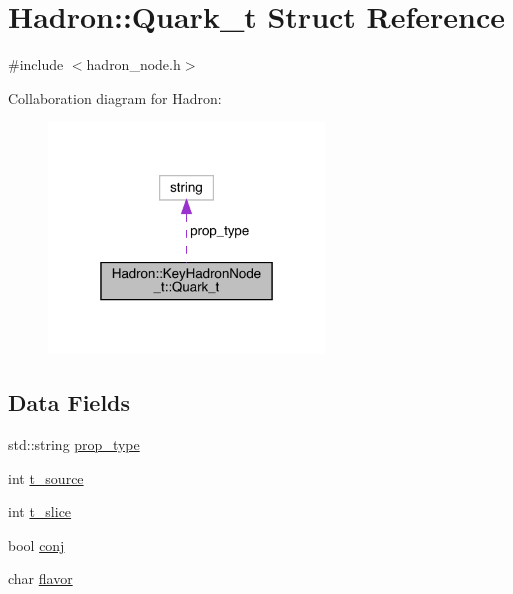 \hypertarget{structHadron_1_1KeyHadronNode__t_1_1Quark__t}{}\section{Hadron\+:\+:Quark\+\_\+t Struct Reference}
\label{structHadron_1_1KeyHadronNode__t_1_1Quark__t}


{\ttfamily \#include $<$hadron\+\_\+node.\+h$>$}



Collaboration diagram for Hadron\+:\nopagebreak
\begin{figure}[H]
\begin{center}
\leavevmode
\includegraphics[width=208pt]{d4/d23/structHadron_1_1KeyHadronNode__t_1_1Quark__t__coll__graph}
\end{center}
\end{figure}
\subsection*{Data Fields}
\begin{DoxyCompactItemize}
\item 
std\+::string \mbox{\hyperlink{structHadron_1_1KeyHadronNode__t_1_1Quark__t_a525075ad356f904d39a25478748d067f}{prop\+\_\+type}}
\item 
int \mbox{\hyperlink{structHadron_1_1KeyHadronNode__t_1_1Quark__t_af7bcd4ab54e441cfbc6dbf2ba43f3fa6}{t\+\_\+source}}
\item 
int \mbox{\hyperlink{structHadron_1_1KeyHadronNode__t_1_1Quark__t_add3ee9face146fee3b2a6dc0eff02b02}{t\+\_\+slice}}
\item 
bool \mbox{\hyperlink{structHadron_1_1KeyHadronNode__t_1_1Quark__t_a67328865338fbc10e8ddb249fdbb39f4}{conj}}
\item 
char \mbox{\hyperlink{structHadron_1_1KeyHadronNode__t_1_1Quark__t_a95058a8fa302b7ca4895e56367fd47aa}{flavor}}
\end{DoxyCompactItemize}


